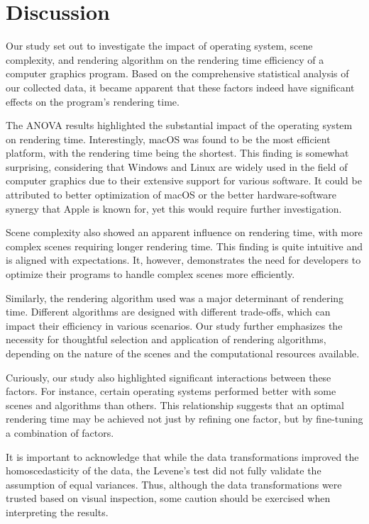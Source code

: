 \documentclass[conference]{IEEEtran}
\begin{document}
\section{Discussion}
Our study set out to investigate the impact of operating system, scene complexity, and rendering algorithm on the rendering time efficiency of a computer graphics program. Based on the comprehensive statistical analysis of our collected data, it became apparent that these factors indeed have significant effects on the program's rendering time.

The ANOVA results highlighted the substantial impact of the operating system on rendering time. Interestingly, macOS was found to be the most efficient platform, with the rendering time being the shortest. This finding is somewhat surprising, considering that Windows and Linux are widely used in the field of computer graphics due to their extensive support for various software. It could be attributed to better optimization of macOS or the better hardware-software synergy that Apple is known for, yet this would require further investigation.

Scene complexity also showed an apparent influence on rendering time, with more complex scenes requiring longer rendering time. This finding is quite intuitive and is aligned with expectations. It, however, demonstrates the need for developers to optimize their programs to handle complex scenes more efficiently.

Similarly, the rendering algorithm used was a major determinant of rendering time. Different algorithms are designed with different trade-offs, which can impact their efficiency in various scenarios. Our study further emphasizes the necessity for thoughtful selection and application of rendering algorithms, depending on the nature of the scenes and the computational resources available.

Curiously, our study also highlighted significant interactions between these factors. For instance, certain operating systems performed better with some scenes and algorithms than others. This relationship suggests that an optimal rendering time may be achieved not just by refining one factor, but by fine-tuning a combination of factors.

It is important to acknowledge that while the data transformations improved the homoscedasticity of the data, the Levene's test did not fully validate the assumption of equal variances. Thus, although the data transformations were trusted based on visual inspection, some caution should be exercised when interpreting the results.
\end{document}
